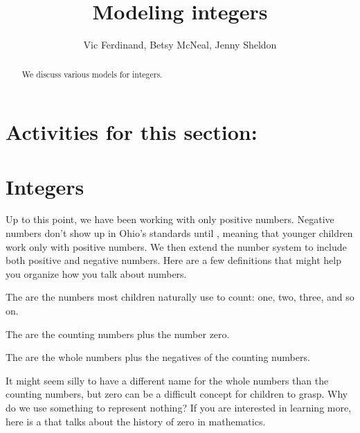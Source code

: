 \documentclass{ximera}
\title{Modeling integers}
\author{Vic Ferdinand, Betsy McNeal, Jenny Sheldon}
\begin{document}
\begin{abstract}
We discuss various models for integers.
\end{abstract}
\maketitle

\section{Activities for this section:}


\section{Integers}

Up to this point, we have been working with only positive numbers. Negative numbers don't show up in Ohio's standards until , meaning that younger children work only with positive numbers. We then extend the number system to include both positive and negative numbers. Here are a few definitions that might help you organize how you talk about numbers.

\begin{definition}
The  are the numbers most children naturally use to count: one, two, three, and so on.
\end{definition}

\begin{definition}
The  are the counting numbers plus the number zero.
\end{definition}

\begin{definition}
The  are the whole numbers plus the negatives of the counting numbers.
\end{definition}

It might seem silly to have a different name for the whole numbers than the counting numbers, but zero can be a difficult concept for children to grasp. Why do we use something to represent nothing? If you are interested in learning more, here is a  that talks about the history of zero in mathematics. 
\end{document}
